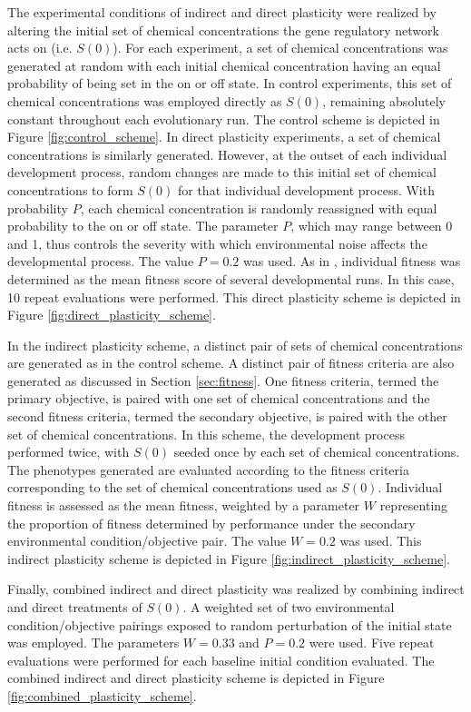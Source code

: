 The experimental conditions of indirect and direct plasticity were realized by altering the initial set of chemical concentrations the gene regulatory network acts on (i.e. $S(0)$).
For each experiment, a set of chemical concentrations was generated at random with each initial chemical concentration having an equal probability of being set in the on or off state.
In control experiments, this set of chemical concentrations was employed directly as $S(0)$, remaining absolutely constant throughout each evolutionary run.
The control scheme is depicted in Figure \ref{fig:control_scheme}.
In direct plasticity experiments, a set of chemical concentrations is similarly generated.
However, at the outset of each individual development process, random changes are made to this initial set of chemical concentrations to form $S(0)$ for that individual development process. 
With probability $P$, each chemical concentration is randomly reassigned with equal probability to the on or off state.
The parameter $P$, which may range between 0 and 1, thus controls the severity with which environmental noise affects the developmental process.
The value $P = 0.2$ was used.
As in \cite{Reisinger2005TowardsEvolvability}, individual fitness was determined as the mean fitness score of several developmental runs.
In this case, 10 repeat evaluations were performed.
This direct plasticity scheme is depicted in Figure \ref{fig:direct_plasticity_scheme}.

In the indirect plasticity scheme, a distinct pair of sets of chemical concentrations are generated as in the control scheme.
A distinct pair of fitness criteria are also generated as discussed in Section \ref{sec:fitness}.
One fitness criteria, termed the primary objective, is paired with one set of chemical concentrations and the second fitness criteria, termed the secondary objective, is paired with the other set of chemical concentrations.
In this scheme, the development process performed twice, with $S(0)$ seeded once by each set of chemical concentrations. 
The phenotypes generated are evaluated according to the fitness criteria corresponding to the set of chemical concentrations used as $S(0)$.
Individual fitness is assessed as the mean fitness, weighted by a parameter $W$ representing the proportion of fitness determined by performance under the secondary environmental condition/objective pair.
The value $W = 0.2$ was used.
This indirect plasticity scheme is depicted in Figure \ref{fig:indirect_plasticity_scheme}. 

Finally, combined indirect and direct plasticity was realized by combining indirect and direct treatments of $S(0)$.
A weighted set of two environmental condition/objective pairings exposed to random perturbation of the initial state was employed.
The parameters $W = 0.33$ and $P = 0.2$ were used.
Five repeat evaluations were performed for each baseline initial condition evaluated.
The combined indirect and direct plasticity scheme is depicted in Figure \ref{fig:combined_plasticity_scheme}.

